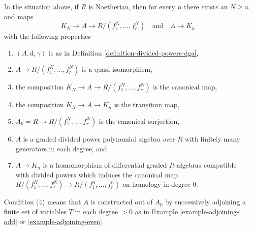 \begin{lemma}
\label{lemma-lift-tate-to-koszul}
In the situation above, if $R$ is Noetherian, then
for every $n$ there exists an $N \geq n$ and maps
$$
K_N \to A \to R/(f_1^N, \ldots, f_r^N)\quad\text{and}\quad A \to K_n
$$
with the following properties
\begin{enumerate}
\item $(A, \text{d}, \gamma)$ is as in
Definition \ref{definition-divided-powers-dga},
\item $A \to R/(f_1^N, \ldots, f_r^N)$ is a quasi-isomorphism,
\item the composition $K_N \to A \to R/(f_1^N, \ldots, f_r^N)$
is the canonical map,
\item the composition $K_N \to A \to K_n$ is the transition map,
\item $A_0 = R \to R/(f_1^N, \ldots, f_r^N)$ is the canonical
surjection,
\item $A$ is a graded divided power polynomial algebra over $R$
with finitely many generators in each degree, and
\item $A \to K_n$ is a homomorphism of differential graded $R$-algebras
compatible with divided powers which induces the canonical map
$R/(f_1^N, \ldots, f_r^N) \to R/(f_1^n, \ldots, f_r^n)$ on
homology in degree $0$.
\end{enumerate}
Condition (4) means that $A$ is constructed out of $A_0$ by
successively adjoining a finite set of variables $T$ in each degree
$> 0$ as in Example \ref{example-adjoining-odd} or \ref{example-adjoining-even}.
\end{lemma}

